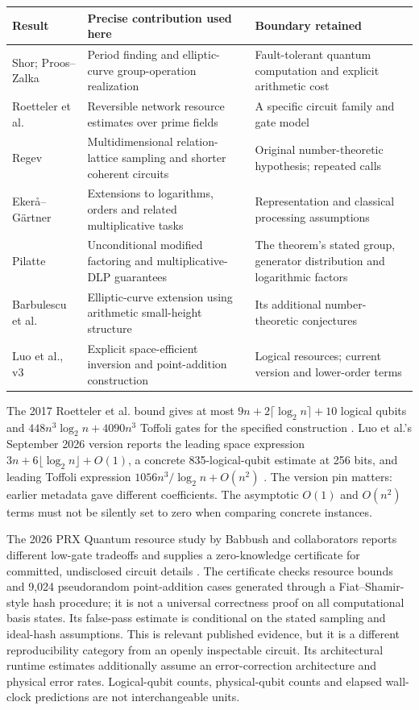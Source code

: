\begin{longtable}{p{}p{}p{}}
\toprule
Result & Precise contribution used here & Boundary retained\\\midrule
Shor; Proos--Zalka & Period finding and elliptic-curve group-operation realization & Fault-tolerant quantum computation and explicit arithmetic cost\\
Roetteler et al. & Reversible network resource estimates over prime fields & A specific circuit family and gate model\\
Regev & Multidimensional relation-lattice sampling and shorter coherent circuits & Original number-theoretic hypothesis; repeated calls\\
Eker\aa--G\"artner & Extensions to logarithms, orders and related multiplicative tasks & Representation and classical processing assumptions\\
Pilatte & Unconditional modified factoring and multiplicative-DLP guarantees & The theorem's stated group, generator distribution and logarithmic factors\\
Barbulescu et al. & Elliptic-curve extension using arithmetic small-height structure & Its additional number-theoretic conjectures\\
Luo et al., v3 & Explicit space-efficient inversion and point-addition construction & Logical resources; current version and lower-order terms\\\bottomrule
\end{longtable}

The 2017 Roetteler et al. bound gives at most
$9n+2\lceil\log_2n\rceil+10$ logical qubits and
$448n^3\log_2n+4090n^3$ Toffoli gates for the specified construction \cite{Roetteler}. Luo et al.'s September 2026 version reports the leading space expression
$3n+6\lfloor\log_2n\rfloor+O(1)$, a concrete 835-logical-qubit estimate at 256 bits, and leading Toffoli expression
$1056n^3/\log_2n+O(n^2)$ \cite{Luo2026}. The version pin matters: earlier metadata gave different coefficients. The asymptotic $O(1)$ and $O(n^2)$ terms must not be silently set to zero when comparing concrete instances.

The 2026 PRX Quantum resource study by Babbush and collaborators reports different low-gate tradeoffs and supplies a zero-knowledge certificate for committed, undisclosed circuit details \cite{Babbush2026}. The certificate checks resource bounds and 9,024 pseudorandom point-addition cases generated through a Fiat--Shamir-style hash procedure; it is not a universal correctness proof on all computational basis states. Its false-pass estimate is conditional on the stated sampling and ideal-hash assumptions. This is relevant published evidence, but it is a different reproducibility category from an openly inspectable circuit. Its architectural runtime estimates additionally assume an error-correction architecture and physical error rates. Logical-qubit counts, physical-qubit counts and elapsed wall-clock predictions are not interchangeable units.

